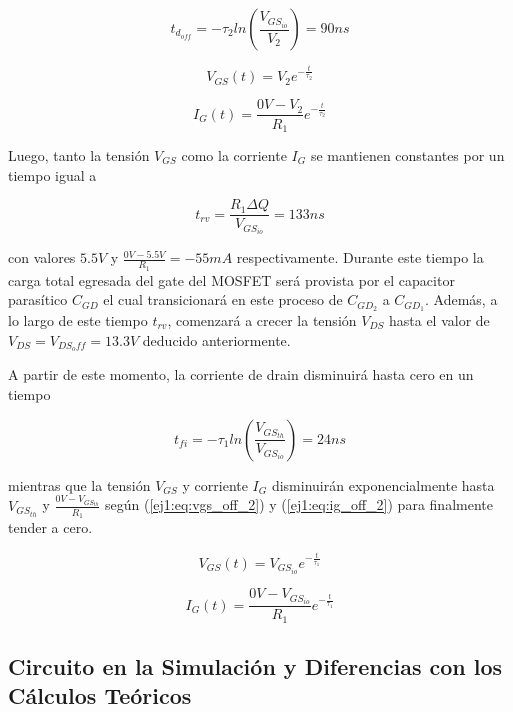\begin{equation}
t_{d_{off}} = -\tau_2 ln(\frac{V_{GS_{io}}}{V_2}) = 90ns
\label{ej1:eq:toff}
\end{equation}

\begin{equation}
V_{GS}(t) = V_2e^{-\frac{t}{\tau_2}}
\label{ej1:eq:vgs_off_1}
\end{equation}

\begin{equation}
I_{G}(t) = \frac{0V-V_2}{R_1} e^{-\frac{t}{\tau_2}}
\label{ej1:eq:ig_off_1}
\end{equation}

Luego, tanto la tensión $V_{GS}$ como la corriente $I_G$ se mantienen constantes por un tiempo igual a 

\begin{equation}
t_{rv} = \frac{R_1 \Delta Q}{V_{GS_{io}}} = 133ns
\label{ej1:eq:trv}
\end{equation}

con valores $5.5V$ y $\frac{0V-5.5V}{R_1} = -55mA$ respectivamente. Durante este tiempo la carga total egresada del gate del MOSFET será provista por el capacitor parasítico $C_{GD}$ el cual transicionará en este proceso de $C_{GD_2}$ a $C_{GD_1}$. Además, a lo largo de este tiempo $t_{rv}$, comenzará a crecer la tensión $V_{DS}$ hasta el valor de $V_{DS} = V_{DS_off} = 13.3V$ deducido anteriormente.

A partir de este momento, la corriente de drain disminuirá hasta cero en un tiempo

\begin{equation}
t_{fi} = -\tau_1 ln\left( \frac{V_{GS_{th}}}{V_{GS_{io}}} \right) = 24ns
\label{ej1:eq:tfi}
\end{equation}

mientras que la tensión $V_{GS}$ y corriente $I_G$ disminuirán exponencialmente hasta $V_{GS_{th}}$ y $\frac{0V-V_{GS_{th}}}{R_1}$ según (\ref{ej1:eq:vgs_off_2}) y (\ref{ej1:eq:ig_off_2}) para finalmente tender a cero.

\begin{equation}
V_{GS}(t) = V_{GS_{io}} e^{-\frac{t}{\tau_1}}
\label{ej1:eq:vgs_off_2}
\end{equation}

\begin{equation}
I_{G}(t) = \frac{0V-V_{GS_{io}}}{R_1} e^{-\frac{t}{\tau_1}}
\label{ej1:eq:ig_off_2}
\end{equation}

\subsection{Circuito en la Simulación y Diferencias con los Cálculos Teóricos}

